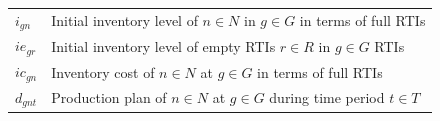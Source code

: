 \begin{longtable}[hbt!]{  |p{}|p{}  |}
  \textit{$i_{gn}$}                                                                              & Initial inventory level of $n\in N$ in $g \in G$ in terms of full RTIs                                                                                                                                                                                                                                                                                                                                                                                                                                                                                                         \\
  \textit{$ie_{gr}$}                                                                             & Initial inventory level of empty RTIs $r\in R$ in $g \in G$ RTIs                                                                                                                                                                                                                                                                                                                                                                                                                                                                                                               \\
  \textit{$ic_{gn}$}                                                                             & Inventory cost of $n\in N$ at $g \in G$ in terms of full RTIs                                                                                                                                                                                                                                                                                                                                                                                                                                                                                                                  \\
  $d_{gnt}$                                                                                      & Production plan of $n \in N$ at $g \in G$ during time period $t\in T$                                                                                                                                                                                                                                                                                                                                                                                                                                                                                                          \\

\end{longtable}
